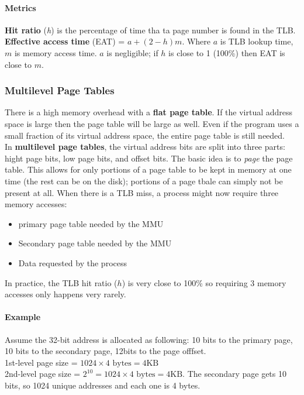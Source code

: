 \documentclass{article}
\newcommand{\bold}[1]{\textbf{#1}}
\renewcommand{\b}{\item[$\circ$]}
\newcommand{\newlist}{\begin{itemize}}
\renewcommand{\endlist}{\end{itemize}}
\begin{document}
\paragraph{Metrics}

\bold{Hit ratio} (\emph{h}) is the percentage of time tha ta page number is found in the TLB. \\ 

\bold{Effective access time} (EAT) = $a + (2-h)m$. Where $a$ is TLB lookup time, $m$ is memory access time. $a$ is negligible; if $h$ is close to 1 (100\%) then EAT is close to $m$. 

\subsubsection{Multilevel Page Tables}

There is a high memory overhead with a \bold{flat page table}. If the virtual address space is large then the page table will be large as well. Even if the program uses a small fraction of its virtual address space, the entire page table is still needed. \\

In \bold{multilevel page tables}, the virtual address bits are split into three parts: hight page bits, low page bits, and offset bits. The basic idea is to \emph{page} the page table. This allows for only portions of a page table to be kept in memory at one time (the rest can be on the disk); portions of a page tbale can simply not be present at all. When there is a TLB miss, a process might now require three memory accesses: 

\newlist
\b primary page table needed by the MMU
\b Secondary page table needed by the MMU
\b Data requested by the process
\endlist

In practice, the TLB hit ratio ($h$) is very close to 100\% so requiring 3 memory accesses only happens very rarely. 
\paragraph{Example}

Assume the 32-bit address is allocated as following: 10 bits to the primary page, 10 bits to the secondary page, 12bits to the page offfset. \\ 

1st-level page size = $1024 \times 4 \textrm{ bytes} = 4\textrm{KB}$ \\ 

2nd-level page size = $2^{10} = 1024 \times 4 \textrm{ bytes} = 4\textrm{KB}$. The secondary page gets 10 bits, so 1024 unique addresses and each one is 4 bytes.
\end{document}
